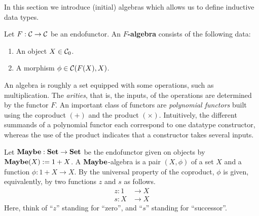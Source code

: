 In this section we introduce (initial) algebras which allows us to define inductive data types.

\begin{dfn} Let $F:\mathcal{C}\to \mathcal{C}$ be an endofunctor. An \textbf{$F$-algebra} consists of the following data:
\begin{enumerate}
\item An object $X\in {\mathcal{C}}_0$.
\item A morphism $\phi \in {\mathcal{C}}(F(X),X)$.
\end{enumerate}
\end{dfn}

\begin{intu}
An algebra is roughly a set equipped with some operations, such as multiplication.
The \emph{arities}, that is, the inputs, of the operations are determined by the functor $F$.
An important class of functors are \emph{polynomial functors} built using the coproduct $(+)$ and the product $(\times)$.
Intuitively, the different summands of a polynomial functor each correspond to one datatype constructor, whereas the use of the product indicates that a constructor takes several inputs.
\end{intu}

\begin{exa}\label{exa:nno_initial_alg_maybe}
 Let $\mathbf{Maybe} : \mathbf{Set} \to \mathbf{Set}$ be the endofunctor given on objects by $\mathbf{Maybe}(X) := 1 + X$. 
 A $\mathbf{Maybe}$-algebra is a pair $(X,\phi)$ of a set $X$ and a function $\phi : 1 + X \to X$.
 By the universal property of the coproduct, $\phi$ is given, equivalently,
 by two functions $z$ and $s$ as follows.
 \begin{align*}
    z : 1 &\to X
    \\
    s : X &\to X
 \end{align*}
Here, think of ``$z$'' standing for ``zero'', and ``$s$'' standing for ``successor''.
\end{exa}



